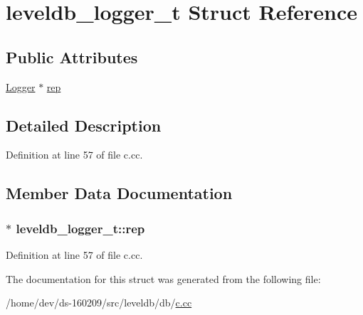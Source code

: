 \hypertarget{structleveldb__logger__t}{}\section{leveldb\+\_\+logger\+\_\+t Struct Reference}
\label{structleveldb__logger__t}
\subsection*{Public Attributes}
\begin{DoxyCompactItemize}
\item 
\hyperlink{classleveldb_1_1_logger}{Logger} $\ast$ \hyperlink{structleveldb__logger__t_aa27dd9e07077dbde7b776c8f548c749b}{rep}
\end{DoxyCompactItemize}


\subsection{Detailed Description}


Definition at line 57 of file c.\+cc.



\subsection{Member Data Documentation}
\hypertarget{structleveldb__logger__t_aa27dd9e07077dbde7b776c8f548c749b}{}
\subsubsection[{rep}]{$\ast$ leveldb\+\_\+logger\+\_\+t\+::rep}\label{structleveldb__logger__t_aa27dd9e07077dbde7b776c8f548c749b}


Definition at line 57 of file c.\+cc.



The documentation for this struct was generated from the following file\+:\begin{DoxyCompactItemize}
\item 
/home/dev/ds-\/160209/src/leveldb/db/\hyperlink{c_8cc}{c.\+cc}\end{DoxyCompactItemize}
